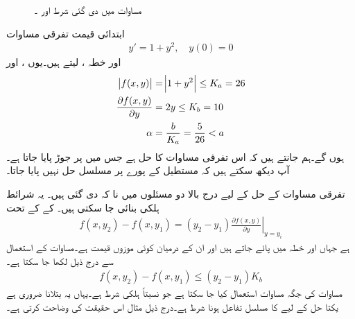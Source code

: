 \begin{figure}
\begin{subfigure}{0.45\textwidth}
\caption{}
\end{subfigure}
\caption{مساوات  میں دی گئی شرط اور ۔}
\label{شکل_سادہ_اول_مستطیل_ثبوت}
\end{figure}

ابتدائی قیمت تفرقی مساوات
\begin{align*}
y'=1+y^2,\quad y(0)=0
\end{align*}
اور خطہ ،  لیتے ہیں۔یوں ،   اور
\begin{align*}
\abs{f(x,y)}&=\abs{1+y^2}\le K_a=26\\
\frac{\partial f(x,y)}{\partial y}&=2y \le K_b=10\\
\alpha&=\frac{b}{K_a}=\frac{5}{26}< a
\end{align*}
ہوں گے۔ہم جانتے ہیں کہ اس تفرقی مساوات کا حل  ہے جس میں  پر جوڑ پایا جاتا ہے۔آپ دیکھ سکتے ہیں کہ مستطیل کے پورے  پر مسلسل حل نہیں پایا جاتا۔

تفرقی مساوات کے حل کے لیے درج بالا دو مسئلوں میں  نا کہ  دی گئی ہیں۔ یہ شرائط  ہلکی بنائی جا سکتی ہیں۔  کے  کے تحت
\begin{align*}
f(x,y_2)-f(x,y_1)=(y_2-y_1)\left. \frac{\partial f(x,y)}{\partial y}\right|_{y=y_{i}}
\end{align*}
ہے جہاں  اور  خطہ  میں پائے جاتے ہیں اور  ان کے درمیان کوئی  موزوں قیمت ہے۔مساوات  کے استعمال سے درج ذیل لکھا جا سکتا ہے۔
\begin{align}\label{مساوات_سادہ_اول_وجودیت_ث}
f(x,y_2)-f(x,y_1) \le (y_2-y_1) K_b
\end{align}
مساوات  کی جگہ  مساوات  استعمال کیا جا سکتا ہے جو نسبتاً ہلکی شرط ہے۔یہاں یہ بتلانا ضروری ہے یکتا حل کے لیے  کا مسلسل تفاعل ہونا   شرط  ہے۔درج ذیل مثال اس حقیقت کی وضاحت کرتی ہے۔

